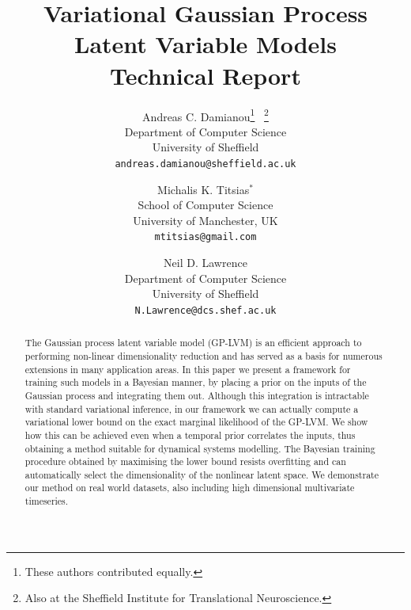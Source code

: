 \documentclass [10pt , a4paper]{article}
\title{Variational Gaussian Process Latent Variable Models \\
Technical Report}
\author{
 Andreas C. Damianou\footnote{These authors contributed equally.} \
 \footnote{Also at the Sheffield Institute for Translational Neuroscience.}\\
 Department of Computer Science\\
 University of Sheffield \\
\texttt{andreas.damianou@sheffield.ac.uk}
            \and
 Michalis K. Titsias$^*$ \\
 School of Computer Science\\
 University of Manchester, UK \\
 \texttt{mtitsias@gmail.com} \\
            \and
 Neil D. Lawrence\footnotemark[\value{footnote}]\\
 Department of Computer Science\\
 University of Sheffield \\
\texttt{N.Lawrence@dcs.shef.ac.uk} 
 }
\begin{document}
\newcommand{\highlight}[1]{\colorbox{yellow}{#1}}

\newcommand{\bff}{\mathbf{f}}
\newcommand{\bfu}{\mathbf{u}}
\newcommand{\bfy}{\mathbf{y}}
\newcommand{\bfx}{\mathbf{x}}
\newcommand{\bft}{\mathbf{t}}
\newcommand{\bfk}{\mathbf{k}}
\newcommand{\bfzi}{\mathbf{z}}
\newcommand{\bfmu}{\boldsymbol \mu}
\newcommand{\bfz}{\mathbf{0}}
\newcommand{\bftheta}{\boldsymbol \theta}

\newcommand{\ie}{i.e.\ }
\newcommand{\eg}{e.g.\ }

\newcommand{\T}{{\top}}

\newcommand{\bfa}{\mathbf{a}}
\newcommand{\bb}{\beta^{-1}}
\newcommand{\la}{\left\langle}
\newcommand{\ra}{\right\rangle}
\newcommand{\vv}{\vartheta}

\newcommand{\intd}{\text{d}}

\date{}
\maketitle

\begin{abstract}
The Gaussian process latent variable model (GP-LVM) is an
efficient approach to performing non-linear dimensionality
reduction and has served as a basis for numerous extensions
in many application areas.
In this paper we present a framework for training such models
in a Bayesian manner, by placing a prior on the inputs of the
Gaussian process and integrating them out. Although this integration
is intractable with standard variational inference, in our
framework we can actually compute a variational lower bound on the 
exact marginal likelihood of the GP-LVM. We show how this can be achieved
even when a temporal prior correlates the inputs, thus obtaining
a method suitable for dynamical systems modelling. 
The Bayesian training procedure obtained by maximising the lower bound
resists overfitting and can automatically select the
dimensionality of the nonlinear latent space.
We demonstrate our method on real
world datasets, also including high dimensional multivariate timeseries.
\end{abstract}

\newpage

\tableofcontents

\newpage


\end{document}
